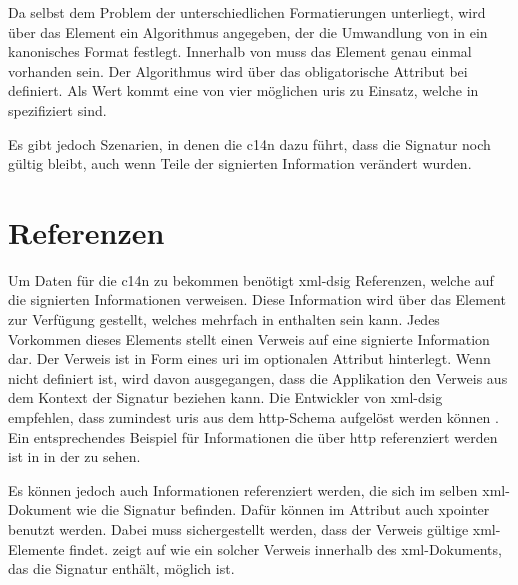 Da  selbst dem Problem der unterschiedlichen Formatierungen unterliegt, wird über das Element  ein
Algorithmus angegeben, der die Umwandlung von  in ein kanonisches Format festlegt. Innerhalb von  muss das Element
 genau einmal vorhanden sein. Der Algorithmus wird über das obligatorische Attribut 
bei  definiert. Als Wert kommt eine von vier möglichen \glspl{uri} zu Einsatz, welche in \cite{xml-dsig:w3c} spezifiziert sind.

Es gibt jedoch Szenarien, in denen die \gls{c14n} dazu führt, dass die Signatur noch gültig bleibt, auch wenn Teile der signierten Information verändert wurden.
\todo

\section{Referenzen}
\label{sec:XML-DSig:Referenzen}
Um Daten für die \gls{c14n} zu bekommen benötigt \gls{xml-dsig} Referenzen, welche auf die signierten Informationen verweisen. Diese Information wird über das 
Element  zur Verfügung gestellt, welches mehrfach in  enthalten sein kann. Jedes Vorkommen dieses Elements stellt einen
Verweis auf eine signierte Information dar. Der Verweis ist in Form eines \gls{uri} im optionalen Attribut  hinterlegt. Wenn
 nicht definiert ist, wird davon ausgegangen, dass die Applikation den Verweis aus dem Kontext der Signatur beziehen kann. Die
Entwickler von \gls{xml-dsig} empfehlen, dass zumindest \glspl{uri} aus dem \gls{http}-Schema aufgelöst werden können \cite{xml-dsig:w3c}. Ein entsprechendes
Beispiel für Informationen die über \gls{http} referenziert werden ist in  in der
 zu sehen.



Es können jedoch auch Informationen referenziert werden, die sich im selben \gls{xml}-Dokument wie die Signatur befinden. Dafür können im Attribut
 auch \gls{xpointer} benutzt werden. Dabei muss sichergestellt werden, dass der Verweis gültige \gls{xml}-Elemente findet.
 zeigt auf  wie ein solcher Verweis innerhalb des \gls{xml}-Dokuments,
das die Signatur enthält, möglich ist.

